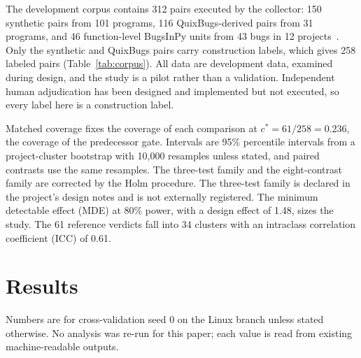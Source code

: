 \documentclass{ieeeaccess}
\begin{document}
The development corpus contains 312 pairs executed by the collector: 150 synthetic pairs from 101 programs, 116 QuixBugs-derived pairs from 31 programs, and 46 function-level BugsInPy units from 43 bugs in 12 projects~\cite{lin2017quixbugs,widyasari2020bugsinpy}. Only the synthetic and QuixBugs pairs carry construction labels, which gives 258 labeled pairs (Table~\ref{tab:corpus}). All data are development data, examined during design, and the study is a pilot rather than a validation. Independent human adjudication has been designed and implemented but not executed, so every label here is a construction label.

Matched coverage fixes the coverage of each comparison at $c^\ast=61/258=0.236$, the coverage of the predecessor gate. Intervals are 95\% percentile intervals from a project-cluster bootstrap with 10{,}000 resamples unless stated, and paired contrasts use the same resamples. The three-test family and the eight-contrast family are corrected by the Holm procedure. The three-test family is declared in the project's design notes and is not externally registered. The minimum detectable effect (MDE) at 80\% power, with a design effect of 1.48, sizes the study. The 61 reference verdicts fall into 34 clusters with an intraclass correlation coefficient (ICC) of 0.61.





\section{Results}\label{sec:results}
Numbers are for cross-validation seed 0 on the Linux branch unless stated otherwise. No analysis was re-run for this paper; each value is read from existing machine-readable outputs.
\end{document}

